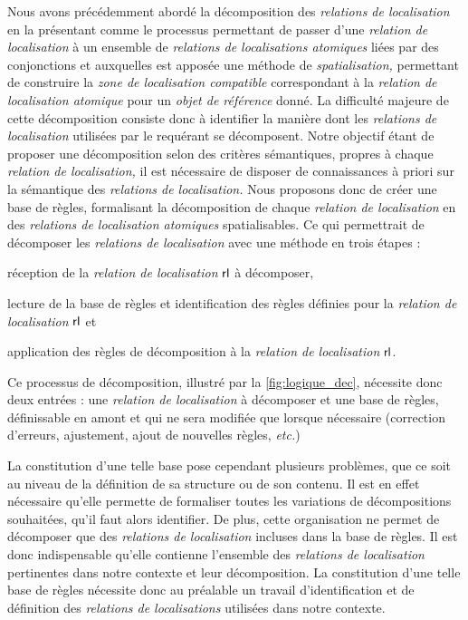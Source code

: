 Nous avons précédemment abordé la décomposition des \emph{relations de
  localisation} en la présentant comme le processus permettant de
passer d'une \emph{relation de localisation} à un ensemble de
\emph{relations de localisations atomiques} liées par des conjonctions
et auxquelles est apposée une méthode de \emph{spatialisation,}
permettant de construire la \emph{zone de localisation compatible}
correspondant à la \emph{relation de localisation atomique} pour un
\emph{objet de référence} donné. La difficulté majeure de cette
décomposition consiste donc à identifier la manière dont les
\emph{relations de localisation} utilisées par le requérant se
décomposent. Notre objectif étant de proposer une décomposition selon
des critères sémantiques, propres à chaque \emph{relation de
  localisation,} il est nécessaire de disposer de connaissances à
priori sur la sémantique des \emph{relations de localisation.} Nous
proposons donc de créer une base de règles, formalisant la
décomposition de chaque \emph{relation de localisation} en des
\emph{relations de localisation atomiques} spatialisables. Ce qui
permettrait de décomposer les \emph{relations de localisation} avec une
méthode en trois étapes :
%
\begin{enumerate*}[label=(\arabic*)] 
\item réception de la \emph{relation de localisation}
  $\text{\textsf{rl}}$ à décomposer,
\item lecture de la base de règles et identification des règles
  définies pour la \emph{relation de localisation}
  $\text{\textsf{rl}}$ et
\item application des règles de décomposition à la \emph{relation de
    localisation} $\text{\textsf{rl}}$.
\end{enumerate*}
%
Ce processus de décomposition, illustré par la
\autoref{fig:logique_dec}, nécessite donc deux entrées : une
\emph{relation de localisation} à décomposer et une base de règles,
définissable en amont et qui ne sera modifiée que lorsque nécessaire
(\eg correction d'erreurs, ajustement, ajout de nouvelles règles,
\emph{etc.})

La constitution d'une telle base pose cependant plusieurs problèmes,
que ce soit au niveau de la définition de sa structure ou de son
contenu. Il est en effet nécessaire qu'elle permette de formaliser
toutes les variations de décompositions souhaitées, qu'il faut alors
identifier. De plus, cette organisation ne permet de décomposer que
des \emph{relations de localisation} incluses dans la base de
règles. Il est donc indispensable qu'elle contienne l'ensemble des
\emph{relations de localisation} pertinentes dans notre contexte et
leur décomposition. La constitution d'une telle base de règles
nécessite donc au préalable un travail d'identification et de
définition des \emph{relations de localisations} utilisées dans notre
contexte.

